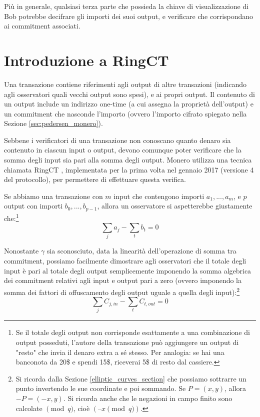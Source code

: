 Più in generale, qualsiasi terza parte che possieda la chiave di visualizzazione di Bob potrebbe decifrare gli importi dei suoi output, e verificare che corrispondano ai commitment associati.



\section{Introduzione a RingCT}
\label{sec:ringct-introduction}

Una transazione contiene riferimenti agli output di altre transazioni (indicando agli osservatori quali vecchi output sono spesi), e ai propri output. Il contenuto di un output include un indirizzo one-time (a cui assegna la proprietà dell’output) e un commitment che nasconde l’importo (ovvero l’importo cifrato spiegato nella Sezione \ref{sec:pedersen_monero}).

Sebbene i verificatori di una transazione non conoscano quanto denaro sia contenuto in ciascun input o output, devono comunque poter verificare che la somma degli input sia pari alla somma degli output. Monero utilizza una tecnica chiamata RingCT \cite{MRL-0005-ringct}, implementata per la prima volta nel gennaio 2017 (versione 4 del protocollo), per permettere di effettuare questa verifica.

Se abbiamo una transazione con $m$ input che contengono importi \(a_1, ..., a_m\), e $p$ output con importi \(b_0, ..., b_{p-1}\), allora un osservatore si aspetterebbe giustamente che:\footnote{Se il totale degli output non corrisponde esattamente a una combinazione di output posseduti, l’autore della transazione può aggiungere un output di "resto" che invia il denaro extra a sé stesso. Per analogia: se hai una banconota da 20\$ e spendi 15\$, riceverai 5\$ di resto dal cassiere.}\vspace{.175cm}
\[\sum_j a_j - \sum_t b_t = 0\]

Nonostante $\gamma$ sia sconosciuto, data la linearità dell'operazione di somma tra commitment, possiamo facilmente dimostrare agli osservatori che il totale degli input è pari al totale degli output semplicemente imponendo la somma algebrica dei commitment relativi agli input e output pari a zero (ovvero imponendo la somma dei fattori di offuscamento degli output uguale a quella degli input):\footnote{Si ricorda dalla Sezione \ref{elliptic_curves_section} che possiamo sottrarre un punto invertendo le sue coordinate e poi sommando. Se $P = (x, y)$, allora $-P = (-x, y)$. Si ricorda anche che le negazioni in campo finito sono calcolate $\pmod q$, cioè $(–x \pmod q)$.}\vspace{.175cm}
\[\sum_{j}{C_{j, in}} - \sum_{t}{C_{t, out}} = 0\]

